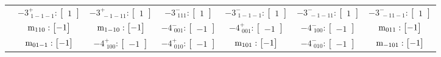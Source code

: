\documentclass[fleqn,8pt,landscape]{jsarticle}
\begin{document}
\begin{longtable}{ccccccc}
& $ -3^{+}_{\,\,1-1-1}:\begin{bmatrix} 1 \end{bmatrix} $ & $ -3^{+}_{\,\,-1-11}:\begin{bmatrix} 1 \end{bmatrix} $ & $ -3^{-}_{\,\,111}:\begin{bmatrix} 1 \end{bmatrix} $ & $ -3^{-}_{\,\,1-1-1}:\begin{bmatrix} 1 \end{bmatrix} $ & $ -3^{-}_{\,\,-1-11}:\begin{bmatrix} 1 \end{bmatrix} $ & $ -3^{-}_{\,\,-11-1}:\begin{bmatrix} 1 \end{bmatrix} $ \\
& $ {\rm m}_{110}:\begin{bmatrix} -1 \end{bmatrix} $ & $ {\rm m}_{1-10}:\begin{bmatrix} -1 \end{bmatrix} $ & $ -4^{-}_{\,\,001}:\begin{bmatrix} -1 \end{bmatrix} $ & $ -4^{+}_{\,\,001}:\begin{bmatrix} -1 \end{bmatrix} $ & $ -4^{-}_{\,\,100}:\begin{bmatrix} -1 \end{bmatrix} $ & $ {\rm m}_{011}:\begin{bmatrix} -1 \end{bmatrix} $ \\
& $ {\rm m}_{01-1}:\begin{bmatrix} -1 \end{bmatrix} $ & $ -4^{+}_{\,\,100}:\begin{bmatrix} -1 \end{bmatrix} $ & $ -4^{+}_{\,\,010}:\begin{bmatrix} -1 \end{bmatrix} $ & $ {\rm m}_{101}:\begin{bmatrix} -1 \end{bmatrix} $ & $ -4^{-}_{\,\,010}:\begin{bmatrix} -1 \end{bmatrix} $ & $ {\rm m}_{-101}:\begin{bmatrix} -1 \end{bmatrix} $ \\ \hline

\end{longtable}
\end{document}
